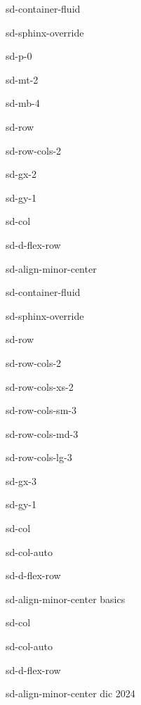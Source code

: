 \documentclass[letterpaper,10pt,italian]{jupyterBook}
\begin{document}
\sphinxstepscope

\begin{sphinxuseclass}{sd-container-fluid}
\begin{sphinxuseclass}{sd-sphinx-override}
\begin{sphinxuseclass}{sd-p-0}
\begin{sphinxuseclass}{sd-mt-2}
\begin{sphinxuseclass}{sd-mb-4}
\begin{sphinxuseclass}{sd-row}
\begin{sphinxuseclass}{sd-row-cols-2}
\begin{sphinxuseclass}{sd-gx-2}
\begin{sphinxuseclass}{sd-gy-1}
\begin{sphinxuseclass}{sd-col}
\begin{sphinxuseclass}{sd-d-flex-row}
\begin{sphinxuseclass}{sd-align-minor-center}
\begin{sphinxuseclass}{sd-container-fluid}
\begin{sphinxuseclass}{sd-sphinx-override}
\begin{sphinxuseclass}{sd-row}
\begin{sphinxuseclass}{sd-row-cols-2}
\begin{sphinxuseclass}{sd-row-cols-xs-2}
\begin{sphinxuseclass}{sd-row-cols-sm-3}
\begin{sphinxuseclass}{sd-row-cols-md-3}
\begin{sphinxuseclass}{sd-row-cols-lg-3}
\begin{sphinxuseclass}{sd-gx-3}
\begin{sphinxuseclass}{sd-gy-1}
\begin{sphinxuseclass}{sd-col}
\begin{sphinxuseclass}{sd-col-auto}
\begin{sphinxuseclass}{sd-d-flex-row}
\begin{sphinxuseclass}{sd-align-minor-center}
\sphinxAtStartPar
basics

\end{sphinxuseclass}
\end{sphinxuseclass}
\end{sphinxuseclass}
\end{sphinxuseclass}
\begin{sphinxuseclass}{sd-col}
\begin{sphinxuseclass}{sd-col-auto}
\begin{sphinxuseclass}{sd-d-flex-row}
\begin{sphinxuseclass}{sd-align-minor-center}
 dic 2024


\end{sphinxuseclass}
\end{sphinxuseclass}
\end{sphinxuseclass}
\end{sphinxuseclass}
\end{sphinxuseclass}
\end{sphinxuseclass}
\end{sphinxuseclass}
\end{sphinxuseclass}
\end{sphinxuseclass}
\end{sphinxuseclass}
\end{sphinxuseclass}
\end{sphinxuseclass}
\end{sphinxuseclass}
\end{sphinxuseclass}
\end{sphinxuseclass}
\end{sphinxuseclass}
\end{sphinxuseclass}
\end{sphinxuseclass}
\end{sphinxuseclass}
\end{sphinxuseclass}
\end{sphinxuseclass}
\end{sphinxuseclass}
\end{sphinxuseclass}
\end{sphinxuseclass}
\end{sphinxuseclass}
\end{sphinxuseclass}
\end{document}
